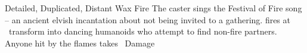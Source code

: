   {Detailed, Duplicated, Distant}%
  {Wax}%
  {Fire}%
  {}%
  {The caster sings the Festival of Fire song -- an ancient elvish incantation about not being invited to a gathering.
     fires at \spellRange\ transform into dancing humanoids who attempt to find non-fire partners.
    Anyone hit by the flames takes \showDam\ Damage}%
  {}

